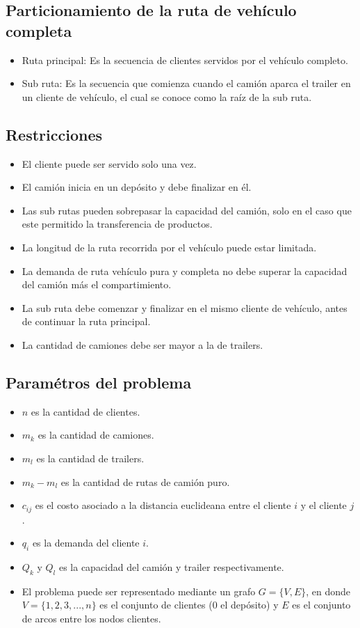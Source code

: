 \documentclass[letter, 10pt]{article}
\begin{document}
 \subsection{Particionamiento de la ruta de vehículo completa}
\begin{itemize}
    \item Ruta principal: Es la secuencia de clientes servidos por el vehículo completo.
    \item Sub ruta: Es la secuencia que comienza cuando el camión aparca el trailer en un cliente de vehículo, el cual se conoce como la raíz de la sub ruta. 
\end{itemize}

\subsection{Restricciones}
\begin{itemize}
    \item El cliente puede ser servido solo una vez.
    \item El camión inicia en un depósito y debe finalizar en él.
    \item Las sub rutas pueden sobrepasar la capacidad del camión, solo en el caso que este permitido la transferencia de productos.
    \item La longitud de la ruta recorrida por el vehículo puede estar limitada.
    \item La demanda de ruta vehículo pura y completa no debe superar la capacidad del camión más el compartimiento.
    \item La sub ruta debe comenzar y finalizar en el mismo cliente de vehículo, antes de continuar la ruta principal.
    \item La cantidad de camiones debe ser mayor a la de trailers.
\end{itemize}
\subsection{Paramétros del problema}
\begin{itemize}
    
    \item $n$ es la cantidad de clientes.
    \item $m_{k}$ es la cantidad de camiones.
    \item $m_{l}$ es la cantidad de trailers.
    \item $m_{k}-m_{l}$ es la cantidad de rutas de camión puro.
    \item $c_{ij}$ es el costo asociado a la distancia euclideana entre el cliente $i$ y el cliente $j$.
    \item $q_{i}$ es la demanda del cliente $i$.
    \item $Q_{k} $ y $Q_{l}$ es la capacidad del camión y trailer respectivamente.
    \item El problema puede ser representado mediante un grafo $G=\{V,E\}$, en donde $V=\{1,2,3,...,n\}$ es el conjunto de clientes (0 el depósito) y $E$ es el conjunto de arcos entre los nodos clientes.
    
\end{itemize}
\end{document}

